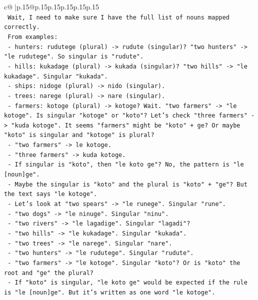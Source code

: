 \documentclass{article}
\begin{document}
{\begin{supertabular}{c@{$\;$}|p{.15\linewidth}@{}p{.15\linewidth}p{.15\linewidth}p{.15\linewidth}p{.15\linewidth}p{.15\linewidth}}
{{{\\ 
\texttt{    Wait, I need to make sure I have the full list of nouns mapped correctly.} \\
\texttt{    From examples:} \\
\texttt{    {-} hunters: rudutege (plural) {-}> rudute (singular)? "two hunters" {-}> "le rudutege". So singular is "rudute".} \\
\texttt{    {-} hills: kukadage (plural) {-}> kukada (singular)? "two hills" {-}> "le kukadage". Singular "kukada".} \\
\texttt{    {-} ships: nidoge (plural) {-}> nido (singular).} \\
\texttt{    {-} trees: narege (plural) {-}> nare (singular).} \\
\texttt{    {-} farmers: kotoge (plural) {-}> kotoge? Wait. "two farmers" {-}> "le kotoge". Is singular "kotoge" or "koto"? Let's check "three farmers" {-}> "kuda kotoge". It seems "farmers" might be "koto" + ge? Or maybe "koto" is singular and "kotoge" is plural?} \\
\texttt{      {-} "two farmers" {-}> le kotoge.} \\
\texttt{      {-} "three farmers" {-}> kuda kotoge.} \\
\texttt{      {-} If singular is "koto", then "le koto ge"? No, the pattern is "le {[}noun{]}ge".} \\
\texttt{      {-} Maybe the singular is "koto" and the plural is "koto" + "ge"? But the text says "le kotoge".} \\
\texttt{      {-} Let's look at "two spears" {-}> "le runege". Singular "rune".} \\
\texttt{      {-} "two dogs" {-}> "le ninuge". Singular "ninu".} \\
\texttt{      {-} "two rivers" {-}> "le lagadige". Singular "lagadi"?} \\
\texttt{      {-} "two hills" {-}> "le kukadage". Singular "kukada".} \\
\texttt{      {-} "two trees" {-}> "le narege". Singular "nare".} \\
\texttt{      {-} "two hunters" {-}> "le rudutege". Singular "rudute".} \\
\texttt{      {-} "two farmers" {-}> "le kotoge". Singular "koto"? Or is "koto" the root and "ge" the plural?} \\
\texttt{      {-} If "koto" is singular, "le koto ge" would be expected if the rule is "le {[}noun{]}ge". But it's written as one word "le kotoge".} \\
}}}
\end{supertabular}}
\end{document}

